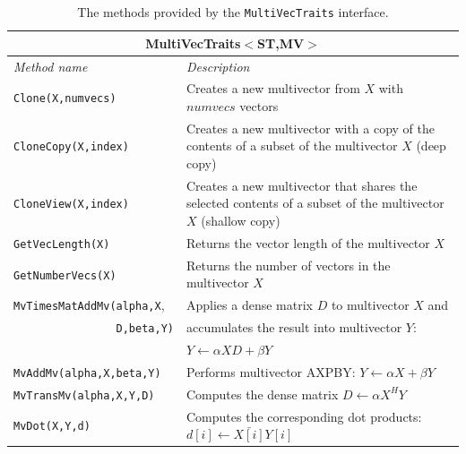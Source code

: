 \documentclass[acmtoms,acmnow]{acmtrans2m}
\newcommand{\aspace}[1]{\texttt{#1}}
\begin{document}
\begin{table}
\begin{center}
  \caption{The methods provided by the \aspace{MultiVecTraits} interface.}
\label{tab:anasazi:mvt}
\begin{tabular}{| p{4cm} | p{8cm} |}
\hline
\multicolumn{2}{|c|}{\textbf{MultiVecTraits$<$ST,MV$>$}} \\\hline
\emph{Method name} & \emph{Description} \\\hline
{\tt Clone(X,numvecs)}           & Creates a new multivector from $X$ with
$numvecs$ vectors  \\

{\tt CloneCopy(X,index)} & Creates a new multivector with a copy of the contents of
a subset of the multivector $X$ (deep copy) \\

{\tt CloneView(X,index)} & Creates a new multivector that shares the selected
contents of a subset of the multivector $X$ (shallow copy)  \\\hline

{\tt GetVecLength(X)} & Returns the vector length of the multivector $X$
\\

{\tt GetNumberVecs(X)}& Returns the number of vectors in the multivector $X$
\\\hline

{\tt MvTimesMatAddMv(alpha,X}, & Applies a dense matrix $D$ to multivector $X$ and \\ 
{\tt \ \ \ \ \ \ \ \ \ \ \ \ \ \ \ \ D,beta,Y)} & accumulates the result into multivector $Y$:\\ & $Y \leftarrow \alpha X D + \beta Y$  \\

{\tt MvAddMv(alpha,X,beta,Y)}  & Performs multivector AXPBY: $Y \leftarrow \alpha X + \beta Y$
\\

{\tt MvTransMv(alpha,X,Y,D)} & Computes the dense matrix $D \leftarrow \alpha X^H Y$
\\

{\tt MvDot(X,Y,d)} & Computes the corresponding dot products:
$d[i] \leftarrow \bar{X[i]} Y[i]$  \\


\end{tabular}
\end{center}
\end{table}
\end{document}
